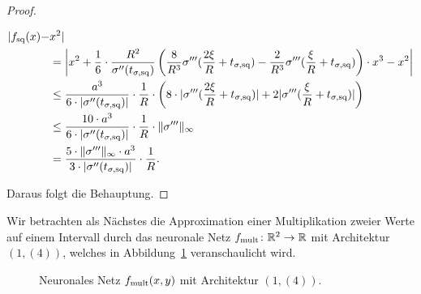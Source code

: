 \begin{proof}
\begin{itemize}
\begin{equation*}
  	\begin{split}
  	 |f_{\mathrm{sq}}(x) -  & x^2| \\
  	& = \bigg|x^2 + \frac{1}{6} \cdot \frac{R^2}{\sigma''(t_{\sigma,\mathrm{sq}})} \left(\frac{8}{R^3}\sigma'''(\frac{2\xi}{R} + t_{\sigma,\mathrm{sq}}) - \frac{2}{R^3} \sigma'''(\frac{\xi}{R} + t_{\sigma,\mathrm{sq}})\right) \cdot x^3 - x^2\bigg| \\
  	& \leq \frac{a^3}{6 \cdot |\sigma''(t_{\sigma,\mathrm{sq}})|} \cdot \frac{1}{R} \cdot \left(8 \cdot |\sigma'''(\frac{2\xi}{R} + t_{\sigma,\mathrm{sq}})| + 2 |\sigma'''(\frac{\xi}{R} + t_{\sigma,\mathrm{sq}})|\right) \\
  	& \leq \frac{10 \cdot a^3}{6 \cdot |\sigma''(t_{\sigma,\mathrm{sq}})|} \cdot \frac{1}{R} \cdot \|\sigma'''\|_{\infty} \\
  	& = \frac{5 \cdot \|\sigma'''\|_{\infty} \cdot a^3}{3 \cdot |\sigma''(t_{\sigma, \mathrm{sq}})|} \cdot \frac{1}{R}. 
  	\end{split}
  	\end{equation*}
 	\end{itemize}
 	Daraus folgt die Behauptung.
\end{proof}
Wir betrachten als Nächstes die Approximation einer Multiplikation zweier Werte auf einem Intervall durch das neuronale Netz $f_{\mathrm{mult}}\colon \mathbb{R}^2 \to \mathbb{R}$ mit Architektur $(1,(4))$, welches in Abbildung~\ref{fig:fmult} veranschaulicht wird.
\begin{figure}[htp]
\centering
{}

\caption{Neuronales Netz $f_{\mathrm{mult}}(x, y)$ mit Architektur $(1,(4))$.}
\label{fig:fmult}
\end{figure}

